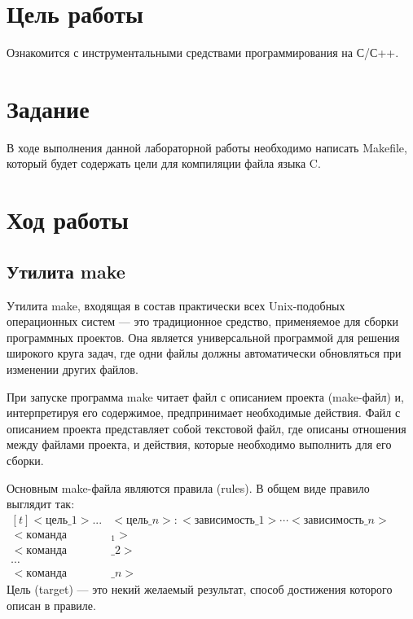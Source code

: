 \documentclass[a4paper,14pt]{extarticle}
\newcommand{\pathToCommonFolder}{/home/denilai/Documents/repos/latex/Common}
\begin{document}
	\thispagestyle{empty}
	
	\newpage
	
\normalsize

\section*{Цель работы}
Ознакомится с инструментальными средствами программирования на С/С++.
\section*{Задание}
В ходе выполнения данной лабораторной работы необходимо написать Makefile, который будет содержать цели для компиляции файла языка C.


\section*{Ход работы}

\subsection*{Утилита make}

Утилита make, входящая в состав практически всех Unix-подобных операционных систем --- это традиционное средство, применяемое для сборки программных проектов. Она является универсальной программой для решения широкого круга задач, где одни файлы должны автоматически обновляться при изменении других файлов.

При запуске программа make читает файл с описанием проекта (make-файл) и, интерпретируя его содержимое, предпринимает необходимые действия. Файл с описанием проекта представляет собой текстовой файл, где описаны отношения между файлами проекта, и действия, которые необходимо выполнить для его сборки.

Основным make-файла являются правила (rules). В общем виде правило выглядит так:\\
$
\begin{aligned}[t]
	<цель\_1> ...& <цель\_n>: <зависимость\_1> \cdots <зависимость\_n>\\ 
	<команда&_1>\\
	<команда&\_2>\\
	\cdots&\\
	<команда&\_n> 
\end{aligned}
$
Цель (target) --- это некий желаемый результат, способ достижения которого описан в правиле.
\end{document}
